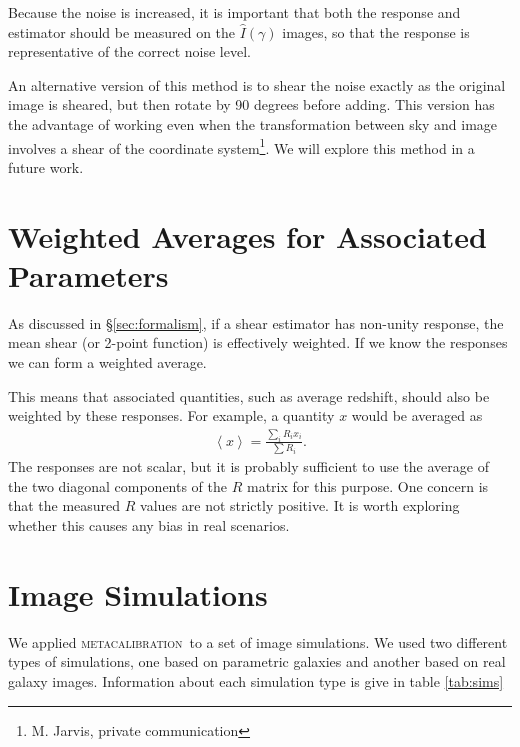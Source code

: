 \documentclass[iop]{emulateapj}
\newcommand{\mcal}{\textsc{metacalibration}}
\begin{document}
Because the noise is increased, it is important that both the response and
estimator should be measured on the $\hat{I}(\gamma)$ images, so that the
response is representative of the correct noise level.

An alternative version of this method is to shear the noise exactly as the
original image is sheared, but then rotate by 90 degrees before adding.  This
version has the advantage of working even when the transformation between sky
and image involves a shear of the coordinate system\footnote{M. Jarvis, private
communication}. We will explore this method in a future work.

\section{Weighted Averages for Associated Parameters} \label{sec:weighting}

As discussed in \S \ref{sec:formalism}, if a shear estimator has
non-unity response, the mean shear (or 2-point function) is effectively
weighted.  If we know the responses we can form a weighted average.

This means that associated quantities, such as average redshift, should also be
weighted by these responses.  For example, a quantity $x$ would be averaged
as
\begin{align}
    \left< x \right> = \frac{\sum_i R_i x_i}{\sum R_i}.
\end{align}
The responses are not scalar, but it is probably sufficient
to use the average of the two diagonal components of the $R$ matrix
for this purpose. One concern is that the measured $R$ values are not
strictly positive.  It is worth exploring whether this causes
any bias in real scenarios.

\section{Image Simulations} \label{sec:sims}

We applied \mcal\ to a set of image simulations.  We used two different
types of simulations, one based on parametric galaxies and another
based on real galaxy images.  Information about each simulation type
is give in table \ref{tab:sims}
\end{document}
